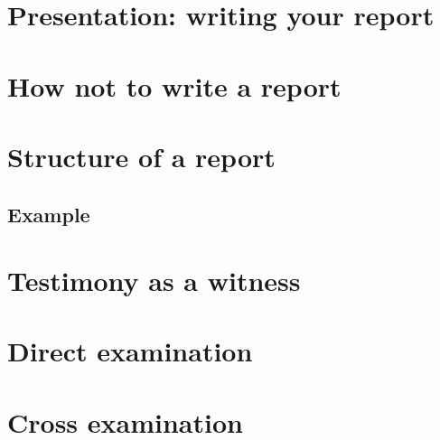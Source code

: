     \section{Presentation: writing your report}
    \section{How not to write a report}
    \section{Structure of a report}
        \subsection{Example}
    \section{Testimony as a witness}
    \section{Direct examination}
    \section{Cross examination}